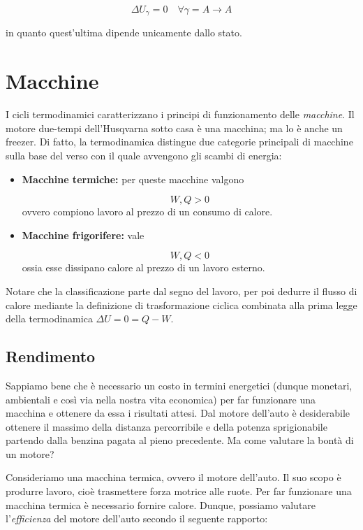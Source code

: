 \[ \Delta U_\gamma = 0 \quad \forall \gamma = A \to A \]

\noindent in quanto quest'ultima dipende unicamente dallo stato.

\section*{Macchine}
I cicli termodinamici caratterizzano i principi di funzionamento delle
\textit{macchine}. Il motore due-tempi dell'Husqvarna sotto
casa è una macchina; ma lo è anche un freezer. Di fatto, la termodinamica
distingue due categorie principali di macchine sulla base del verso con il
quale avvengono gli scambi di energia:

\begin{itemize}
    \item \textbf{Macchine termiche:} per queste macchine valgono
    
    \[ W,Q > 0 \]
    ovvero compiono lavoro al prezzo di un consumo di calore.

    \item \textbf{Macchine frigorifere:} vale
    
    \[ W,Q < 0 \]
    ossia esse dissipano calore al prezzo di un lavoro esterno.
\end{itemize}

Notare che la classificazione parte dal segno del lavoro, per poi
dedurre il flusso di calore mediante la definizione di trasformazione
ciclica combinata alla prima legge della termodinamica $\Delta U = 0 = Q - W$.

\subsection*{Rendimento}
Sappiamo bene che è necessario un costo in termini energetici (dunque monetari,
ambientali e così via nella nostra vita economica) per far funzionare una
macchina e ottenere da essa i risultati attesi. Dal motore dell'auto è desiderabile
ottenere il massimo della distanza percorribile e della potenza sprigionabile
partendo dalla benzina pagata al pieno precedente. Ma come valutare la bontà
di un motore?

Consideriamo una macchina termica, ovvero il motore dell'auto. Il suo scopo
è produrre lavoro, cioè trasmettere forza motrice alle ruote. Per far funzionare
una macchina termica è necessario fornire calore. Dunque, possiamo valutare
l'\textit{efficienza} del motore dell'auto secondo il seguente rapporto:

